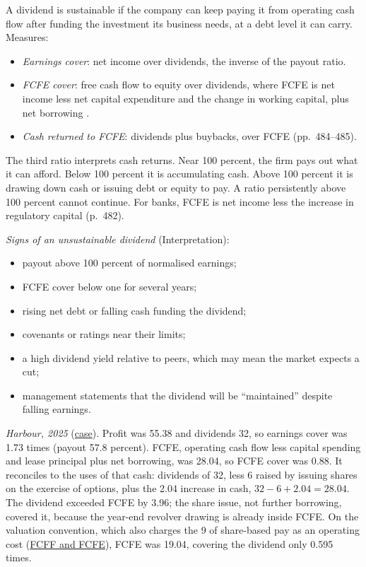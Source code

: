 \begin{qfmethod}\label{meth:dividend-sustainability}
 A dividend is sustainable if the company can keep paying it from operating cash flow after funding the investment its business needs, at a debt level it can carry. Measures:
\begin{itemize}
\item \emph{Earnings cover}: net income over dividends, the inverse of the payout ratio.
\item \emph{FCFE cover}: free cash flow to equity over dividends, where FCFE is net income less net capital expenditure and the change in working capital, plus net borrowing \citep[pp.~480--481]{applied-corporate-finance-2014}.
\item \emph{Cash returned to FCFE}: dividends plus buybacks, over FCFE (pp.~484--485).
\end{itemize}
The third ratio interprets cash returns. Near 100 percent, the firm pays out what it can afford. Below 100 percent it is accumulating cash. Above 100 percent it is drawing down cash or issuing debt or equity to pay. A ratio persistently above 100 percent cannot continue. For banks, FCFE is net income less the increase in regulatory capital (p.~482).

\emph{Signs of an unsustainable dividend} (Interpretation):
\begin{itemize}
\item payout above 100 percent of normalised earnings;
\item FCFE cover below one for several years;
\item rising net debt or falling cash funding the dividend;
\item covenants or ratings near their limits;
\item a high dividend yield relative to peers, which may mean the market expects a cut;
\item management statements that the dividend will be ``maintained'' despite falling earnings.
\end{itemize}

 \emph{Harbour, 2025} (\hyperref[ex:harbour-tools-statements]{case}). Profit was 55.38 and dividends 32, so earnings cover was 1.73 times (payout 57.8 percent). FCFE, operating cash flow less capital spending and lease principal plus net borrowing, was 28.04, so FCFE cover was 0.88. It reconciles to the uses of that cash: dividends of 32, less 6 raised by issuing shares on the exercise of options, plus the 2.04 increase in cash, $32-6+2.04=28.04$. The dividend exceeded FCFE by 3.96; the share issue, not further borrowing, covered it, because the year-end revolver drawing is already inside FCFE. On the valuation convention, which also charges the 9 of share-based pay as an operating cost (\hyperref[meth:free-cash-flow-coverage]{FCFF and FCFE}), FCFE was 19.04, covering the dividend only 0.595 times.


\end{qfmethod}

